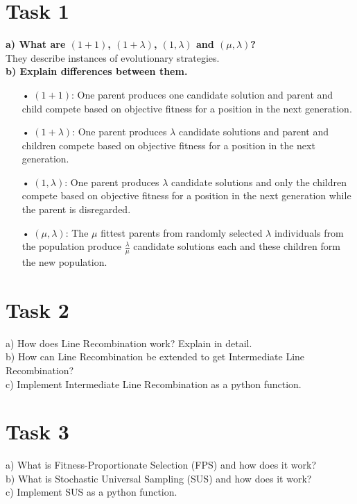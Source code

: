 \documentclass[12pt,letterpaper]{article}
\begin{document}
\section*{Task 1}
\textbf{a) What are $(1+1)$, $(1 + \lambda)$, $(1,\lambda)$ and $(\mu,\lambda)$?}\\
They describe instances of evolutionary strategies.\\

\textbf{b) Explain differences between them.}
\begin{enumerate}
\item[•] $(1+1)$: One parent produces one candidate solution and parent and child compete based on objective fitness for a position in the next generation.
\item[•] $(1 + \lambda)$: One parent produces $\lambda$ candidate solutions and parent and children compete based on objective fitness for a position in the next generation.
\item[•] $(1 , \lambda)$: One parent produces $\lambda$ candidate solutions and only the children compete based on objective fitness for a position in the next generation while the parent is disregarded.
\item[•] $(\mu , \lambda)$: The $\mu$ fittest parents from randomly selected $\lambda$ individuals from the population produce $\frac{\lambda}{\mu}$  candidate solutions each and these children form the new population.
\end{enumerate}

\section*{Task 2}
a) How does Line Recombination work? Explain in detail. \\

b)  How can Line Recombination be extended to get Intermediate Line Recombination? \\

c)  Implement Intermediate Line Recombination as a python function.

\section*{Task 3}
a)  What is Fitness-Proportionate Selection (FPS) and how does it work? \\

b)  What is Stochastic Universal Sampling (SUS) and how does it work? \\

c)  Implement SUS as a python function.
\end{document}
